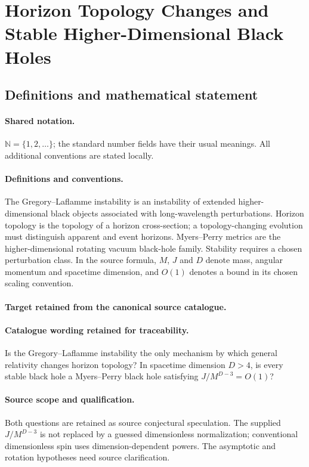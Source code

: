 \documentclass[11pt]{article}
\begin{document}
\section{Horizon Topology Changes and Stable Higher-Dimensional Black Holes}\label{statement}

\subsection{Definitions and mathematical statement}

\paragraph{Shared notation.}$\mathbb N=\{1,2,\ldots\}$; the standard number fields have their usual meanings. All additional conventions are stated locally.


\paragraph{Definitions and conventions.}
The Gregory--Laflamme instability is an instability of extended higher-dimensional black objects associated with long-wavelength perturbations. Horizon topology is the topology of a horizon cross-section; a topology-changing evolution must distinguish apparent and event horizons. Myers--Perry metrics are the higher-dimensional rotating vacuum black-hole family. Stability requires a chosen perturbation class. In the source formula, $M$, $J$ and $D$ denote mass, angular momentum and spacetime dimension, and $O(1)$ denotes a bound in its chosen scaling convention.

\paragraph{Target retained from the canonical source catalogue.}
\paragraph{Catalogue wording retained for traceability.}
Is the Gregory–Laflamme instability the only mechanism by which general relativity changes horizon topology? In spacetime dimension $D>4$, is every stable black hole a Myers–Perry black hole satisfying $J/M^{D-3}=O(1)$?

\paragraph{Source scope and qualification.}
Both questions are retained as source conjectural speculation. The supplied $J/M^{D-3}$ is not replaced by a guessed dimensionless normalization; conventional dimensionless spin uses dimension-dependent powers. The asymptotic and rotation hypotheses need source clarification.
\end{document}
